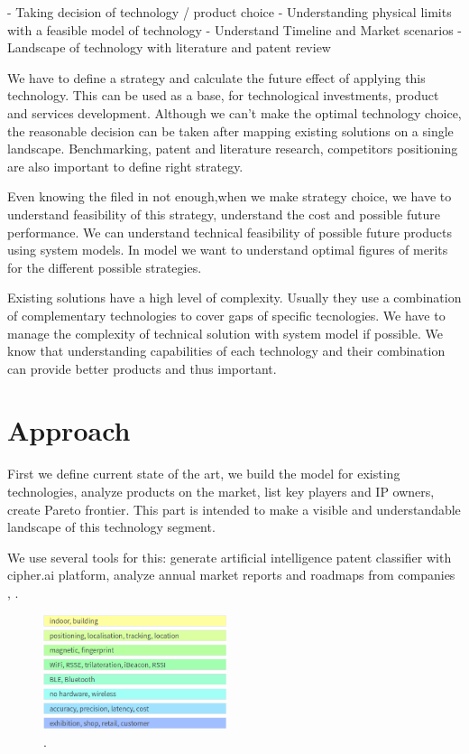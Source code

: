 -  Taking decision of technology / product choice
-  Understanding physical limits with a feasible model of technology
-  Understand Timeline and Market  scenarios
-  Landscape of technology with literature and patent review


We have to define a strategy and calculate the future effect of applying this technology.
This can be used as a base, for technological investments, product and services development.
Although we can't make the optimal technology choice, the reasonable decision can be taken after mapping existing solutions on a single landscape. Benchmarking, patent and literature research, competitors positioning are also important to define right strategy.

Even knowing the filed in not enough,when we make strategy choice, we have to understand feasibility of this strategy, understand the cost and possible future performance. We can understand technical feasibility of possible future products using system models. In model we want to understand optimal figures of merits for the different possible strategies.

Existing solutions have a high level of complexity. Usually they use a combination of complementary technologies to cover gaps of specific tecnologies. We have to manage the complexity of technical solution with system model if possible. We know that understanding capabilities of each technology and their combination can provide better products and thus important.

\section{Approach}

First we define current state of the art, we build the model for existing technologies, analyze products on the market, list key players and IP owners, create Pareto frontier. This part is intended to make a visible and understandable landscape of this technology segment.

We use several tools for this: generate artificial intelligence patent classifier with cipher.ai platform, analyze annual market reports and roadmaps from companies \cite{Infsoft_wp}, \cite{trends2019}.

\begin{figure}[h]
    \centering
    \includegraphics[width=0.48\textwidth]{img/patents/color.png}
    \caption{.}
    \label{fig:Patent-highlighting}
\end{figure}

